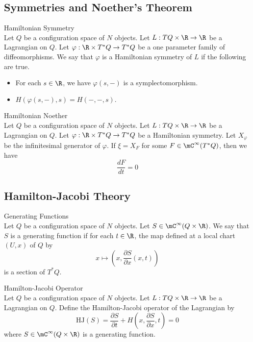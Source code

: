\documentclass[a4paper]{article}
\begin{document}
\subsection{Symmetries and Noether's Theorem}
\begin{defn}{Hamiltonian Symmetry}{}\\
Let $Q$ be a configuration space of $N$ objects. Let $L:TQ\times\R\to\R$ be a Lagrangian on $Q$. Let $\varphi:\R\times T^\ast Q\to T^\ast Q$ be a one parameter family of diffeomorphisms. We say that $\varphi$ is a Hamiltonian symmetry of $L$ if the following are true. 
\begin{itemize}
\item For each $s\in\R$, we have $\varphi(s,-)$ is a symplectomorphism. 
\item $H(\varphi(s,-),s)=H(-,-,s)$. 
\end{itemize}
\end{defn}

\begin{thm}{Hamiltonian Noether}{}\\
Let $Q$ be a configuration space of $N$ objects. Let $L:TQ\times\R\to\R$ be a Lagrangian on $Q$. Let $\varphi:\R\times T^\ast Q\to T^\ast Q$ be a Hamiltonian symmetry. Let $X_\varphi$ be the infinitesimal generator of $\varphi$. If $\xi=X_F$ for some $F\in\mC^\infty(T^\ast Q)$, then we have $$\frac{dF}{dt}=0$$
\end{thm}

\subsection{Hamilton-Jacobi Theory}
\begin{defn}{Generating Functions}{}\\
Let $Q$ be a configuration space of $N$ objects. Let $S\in\mC^\infty(Q\times\R)$. We say that $S$ is a generating function if for each $t\in\R$, the map defined at a local chart $(U,x)$ of $Q$ by $$x\mapsto\left(x,\frac{\partial S}{\partial x}(x,t)\right)$$ is a section of $T^\ast Q$. 
\end{defn}

\begin{defn}{Hamilton-Jacobi Operator}{}\\
Let $Q$ be a configuration space of $N$ objects. Let $L:TQ\times\R\to\R$ be a Lagrangian on $Q$. Define the Hamilton-Jacobi operator of the Lagrangian by $$\text{HJ}(S)=\frac{\partial S}{\partial t}+H\left(x,\frac{\partial S}{\partial x},t\right)=0$$ where $S\in\mC^\infty(Q\times\R)$ is a generating function. 
\end{defn}
\end{document}
